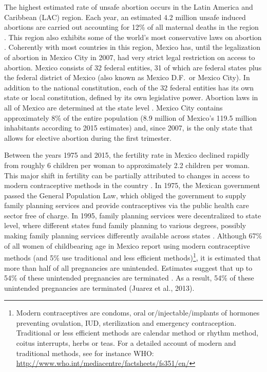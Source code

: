\documentclass[a4paper,11pt]{article}
\begin{document}
\begin{spacing}{1.5}
The highest estimated rate of unsafe abortion occurs in the Latin America and Caribbean (LAC) region. Each year, an estimated 4.2 million unsafe induced abortions are carried out accounting for 12\% of all maternal deaths in the region \citep{WHO2011}. This region also exhibits some of the world’s most conservative laws on abortion \citep{UN2014}. Coherently with most countries in this region, Mexico has, until the legalization of abortion in Mexico City in 2007, had very strict legal restriction on access to abortion. Mexico consists of 32 federal entities, 31 of which are federal states plus the federal district of Mexico (also known as Mexico D.F.\ or Mexico City).  In addition to the national constitution, each of the 32 federal entities has its own state or local constitution, defined by its own legislative power. Abortion laws in all of Mexico are determined at the state level \citep{Becker2013}. Mexico City contains approximately 8\% of the entire population (8.9 million of Mexico's 119.5 million inhabitants according to 2015 estimates) and, since 2007, is the only state that allows for elective abortion during the first trimester.

Between the years 1975 and 2015, the fertility rate in Mexico declined rapidly from roughly 6 children per woman to approximately 2.2 children per woman. This major shift in fertility can be partially attributed to changes in access to modern contraceptive methods in the country \citep{GIRE2009}.  In 1975, the Mexican government passed the General Population Law, which obliged the government to supply family planning services and provide contraceptives via the public health care sector free of charge. In 1995, family planning services were decentralized to state level, where different states fund family planning to various degrees, possibly making family planning services differently available across states \citep{GIRE2009}.  Although 67\% of all women of childbearing age in Mexico report using modern contraceptive methods (and 5\% use traditional and less efficient methods)\footnote{Modern contraceptives are condoms, oral or/injectable/implants of hormones preventing ovulation, IUD, sterilization and emergency contraception. Traditional or less efficient methods are calendar method or rhythm method, coitus interrupts, herbs or teas. For a detailed account of modern and traditional methods, see for instance WHO: \url{http://www.who.int/mediacentre/factsheets/fs351/en/}}, it is estimated that more than half of all pregnancies are unintended. Estimates suggest that up to 54\% of these unintended pregnancies are terminated \citep{GIRE2009}. As a result, 54\% of these unintended pregnancies are terminated (Juarez et al., 2013).


\end{spacing}
\end{document}
